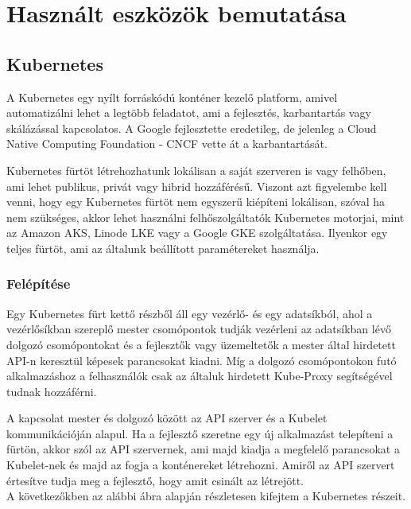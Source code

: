 \chapter{Használt eszközök bemutatása}

\section{Kubernetes}

A Kubernetes egy nyílt forráskódú konténer kezelő platform, amivel automatizálni
lehet a legtöbb feladatot, ami a fejlesztés, karbantartás vagy skálázással 
kapcsolatos. A Google fejlesztette eredetileg, de jelenleg a Cloud Native
Computing Foundation - CNCF vette át a karbantartását. 

Kubernetes fürtöt létrehozhatunk lokálisan a saját szerveren is vagy felhőben,
ami lehet publikus, privát vagy hibrid hozzáférésű. Viszont azt figyelembe 
kell venni, hogy egy Kubernetes fürtöt nem egyszerű kiépíteni lokálisan, 
szóval ha nem szükséges, akkor lehet használni felhőszolgáltatók Kubernetes 
motorjai, mint az Amazon AKS, Linode LKE vagy a Google GKE szolgáltatása.
Ilyenkor egy teljes fürtöt, ami az általunk beállított paramétereket használja.

\subsection{Felépítése}

Egy Kubernetes fürt kettő részből áll egy vezérlő- és egy adatsíkból, ahol a 
vezérlősíkban szereplő mester csomópontok tudják vezérleni az adatsíkban 
lévő dolgozó csomópontokat és a fejlesztők vagy üzemeltetők a mester által
hirdetett API-n keresztül képesek parancsokat kiadni. Míg a dolgozó 
csomópontokon futó alkalmazáshoz a felhasználók csak az általuk hirdetett 
Kube-Proxy segítségével tudnak hozzáférni. 

A kapcsolat mester és dolgozó között az API szerver és a Kubelet kommunikációján
alapul. Ha a fejlesztő szeretne egy új alkalmazást telepíteni a fürtön, akkor
szól az API szervernek, ami majd kiadja a megfelelő parancsokat a Kubelet-nek 
és majd az fogja a konténereket létrehozni. Amiről az API szervert értesítve 
tudja meg a fejlesztő, hogy amit csinált az létrejött. \\

A következőkben az alábbi ábra alapján részletesen kifejtem a Kubernetes 
részeit. 

